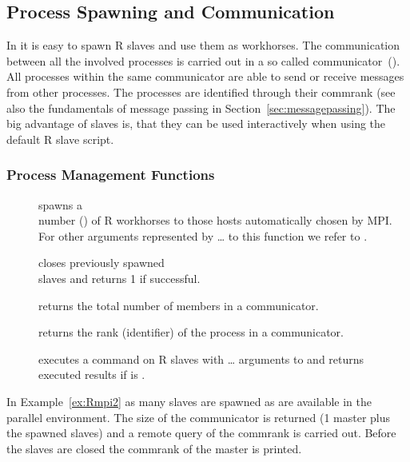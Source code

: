 \subsection{Process Spawning and Communication}

In  it is easy to spawn R slaves and use them as
workhorses. The 
communication between all the involved processes is carried out in a
so called communicator~(). All processes within the same
communicator are able to send or receive messages from other
processes. The processes are identified through their commrank (see
also the fundamentals of message passing in
Section~\ref{sec:messagepassing}). The big advantage of 
slaves is, that they can be used interactively when using the default
R slave script.

\subsubsection{Process Management  Functions}
\begin{description}
\item[]
  spawns a \\number () of R
  workhorses to those hosts automatically chosen by MPI. For other
  arguments represented by \ldots{} to this function we refer to
  \cite{yu06Rmpi}.
\item[] closes
  previously spawned \\slaves and returns 1 if successful.
\item[] returns the total number of members in
  a communicator.
\item[] returns the rank (identifier) of the
  process in a communicator.
\item[]
  executes a command  on R slaves with \ldots{} arguments to
   and returns executed results if  is
  .
\end{description}

In Example~\ref{ex:Rmpi2} as many slaves are spawned as are available
in the parallel environment. The size of the communicator is returned
(1 master plus the spawned slaves) and a remote query of the commrank
is carried out. Before the slaves are closed the commrank of the
master is printed.


